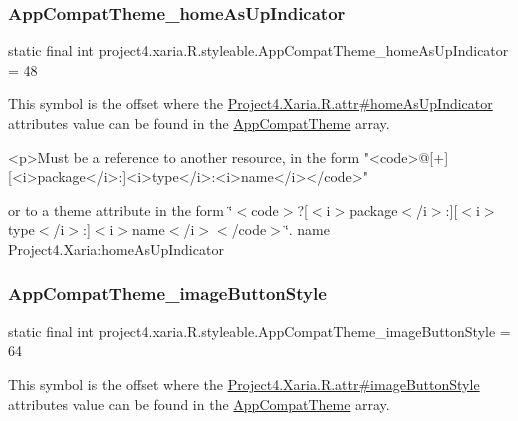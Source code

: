 \subsubsection{\texorpdfstring{App\+Compat\+Theme\+\_\+home\+As\+Up\+Indicator}{AppCompatTheme\_homeAsUpIndicator}}
{\footnotesize\ttfamily static final int project4.\+xaria.\+R.\+styleable.\+App\+Compat\+Theme\+\_\+home\+As\+Up\+Indicator = 48\hspace{0.3cm}{\ttfamily [static]}}

This symbol is the offset where the \hyperlink{}{Project4.\+Xaria.\+R.\+attr\#home\+As\+Up\+Indicator} attribute\textquotesingle{}s value can be found in the \hyperlink{classproject4_1_1xaria_1_1R_1_1styleable_aad8bec413e2350f9404e6ff0e831a85d}{App\+Compat\+Theme} array.

\begin{DoxyVerb}      <p>Must be a reference to another resource, in the form "<code>@[+][<i>package</i>:]<i>type</i>:<i>name</i></code>"
\end{DoxyVerb}
 or to a theme attribute in the form \char`\"{}$<$code$>$?\mbox{[}$<$i$>$package$<$/i$>$\+:\mbox{]}\mbox{[}$<$i$>$type$<$/i$>$\+:\mbox{]}$<$i$>$name$<$/i$>$$<$/code$>$\char`\"{}.  name Project4.\+Xaria\+:home\+As\+Up\+Indicator \mbox{\label{classproject4_1_1xaria_1_1R_1_1styleable_a58cb61a783e430c03d51ecf0f3a7b145}} 
\subsubsection{\texorpdfstring{App\+Compat\+Theme\+\_\+image\+Button\+Style}{AppCompatTheme\_imageButtonStyle}}
{\footnotesize\ttfamily static final int project4.\+xaria.\+R.\+styleable.\+App\+Compat\+Theme\+\_\+image\+Button\+Style = 64\hspace{0.3cm}{\ttfamily [static]}}

This symbol is the offset where the \hyperlink{}{Project4.\+Xaria.\+R.\+attr\#image\+Button\+Style} attribute\textquotesingle{}s value can be found in the \hyperlink{classproject4_1_1xaria_1_1R_1_1styleable_aad8bec413e2350f9404e6ff0e831a85d}{App\+Compat\+Theme} array.

